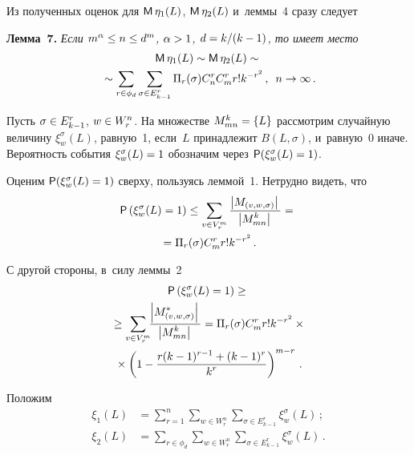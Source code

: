 \begin{multicols}{2}
    Из полученных оценок для  ${\sf M}\, \eta_1(L)$, ${\sf M}\,\eta_2(L)$ 
и~леммы~4 сразу следует 
    
    \smallskip
    
    \noindent
    \textbf{Лемма~7.} \textit{Если $m^\alpha\hm\leq n\hm\leq d^m$, 
$\alpha\hm>1$, $d\hm=k/(k\hm-1)$, то имеет место}
    \begin{multline*}
    {\sf M}\,\eta_1(L)\sim {\sf M}\,\eta_2(L)\sim{}\\
    {}\sim  \sum\limits_{r\in \phi_d} 
\sum\limits_{\sigma\in E^r_{k-1}} \Pi_r(\sigma) C_n^r C_m^r r! k^{-r^2}\,,\enskip 
    n\to\infty\,.
\end{multline*}
    
    Пусть $\sigma \hm\in E^r_{k-1}$, $w\hm\in W_r^n$. На множестве 
$M^k_{mn}\hm= \{L\}$ рассмотрим случайную величину $\xi^\sigma_w(L)$, 
равную~1, если~$L$ принадлежит $B(L,\sigma)$, и~равную~0 иначе. 
Вероятность события $\xi_w^\sigma(L)\hm=1$ обозначим через 
${\sf P}(\xi_w^\sigma(L)\hm=1)$. 
    
    Оценим ${\sf P}(\xi_w^\sigma(L)\hm=1)$ сверху, пользуясь леммой~1. Нетрудно 
видеть, что
    \begin{multline}
    {\sf P}\left( \xi_w^\sigma(L)=1\right)\leq \sum\limits_{v\in V_r^m}\displaystyle\frac{\displaystyle \left\vert 
M_{(v,w,\sigma)}\right\vert \mathstrut}{\displaystyle 
\left\vert M^k_{mn}\right\vert \mathstrut} ={}\\
{}=\Pi_r(\sigma) C_m^r r! k^{-r^2}\,.
    \label{e2-duk}
    \end{multline}
    
    С другой стороны, в~силу леммы~2 
    \begin{multline}
    {\sf P}\left( \xi^\sigma_w(L)=1\right) \geq{}\\
    {}\geq \sum\limits_{v\in V_r^m}\!\! \displaystyle\frac{\displaystyle \left\vert 
M^*_{(v,w,\sigma)}\right\vert\mathstrut}{\displaystyle \left\vert M^k_{mn}\right\vert\mathstrut}=
    \Pi_r(\sigma)C_m^r r! k^{-r^2}\times{}\\
    {}\times \left( 1- \displaystyle\frac{\displaystyle  r(k-1)^{r-1} + (k-1)^r\mathstrut}{\displaystyle 
    k^r\mathstrut}\right)^{m-r}\,.
    \label{e3-duk}
    \end{multline}
    
    Положим
   \begin{align*}
    \xi_1(L)&=\sum\limits^n_{r=1} \sum\limits_{w\in W_r^n} 
\sum\limits_{\sigma\in E^r_{k-1}} \xi_w^\sigma (L)\,;\\
    \xi_2(L)&= \sum\limits_{r\in \phi_d} \sum\limits_{w\in W_r^n} 
\sum\limits_{\sigma\in E^r_{k-1}} \xi_w^\sigma (L)\,.
    \end{align*}
    

\end{multicols}
